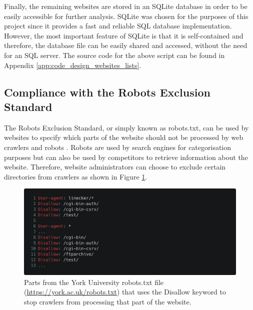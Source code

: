 \documentclass[../main.tex]{subfiles}
\begin{document}


Finally, the remaining websites are stored in an SQLite database in order to be easily accessible for further analysis. SQLite was chosen for the purposes of this project since it provides a fast and reliable SQL database implementation. However, the most important feature of SQLite is that it is self-contained and therefore, the database file can be easily shared and accessed, without the need for an SQL server. The source code for the above script can be found in Appendix \ref{app:code_design_websites_lists}.

\subsection{Compliance with the Robots Exclusion Standard}
The Robots Exclusion Standard, or simply known as robots.txt, can be used by websites to specify which parts of the website should not be processed by web crawlers and robots \cite{koster_1994}. Robots are used by search engines for categorisation purposes but can also be used by competitors to retrieve information about the website. Therefore, website administrators can choose to exclude certain directories from crawlers as shown in Figure \ref{fig:design_example_robots}. 

\begin{figure}[ht]
    \centering
    \includegraphics[width=\textwidth]{images/implementation/example_robots.png}
    \caption{Parts from the York University robots.txt file (\url{https://york.ac.uk/robots.txt}) that uses the Disallow keyword to stop crawlers from processing that part of the website.}
    \label{fig:design_example_robots}
\end{figure}
\end{document}
